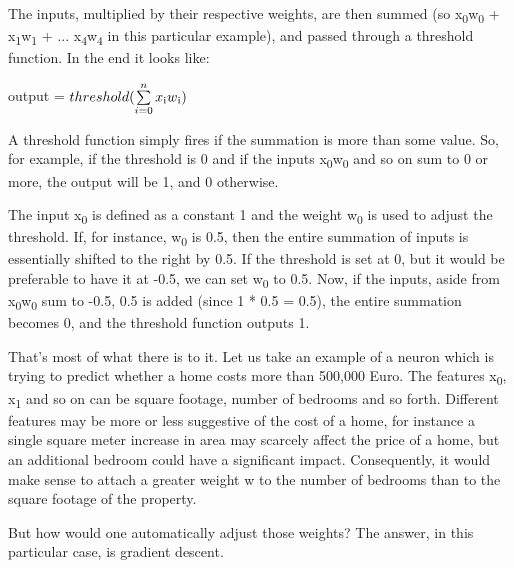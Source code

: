 \documentclass[a4paper, 12pt]{article}
\begin{document}
                        \par The inputs, multiplied by their respective weights, are then summed (so x\textsubscript{0}w\textsubscript{0} + x\textsubscript{1}w\textsubscript{1} + ... x\textsubscript{4}w\textsubscript{4} in this particular example), and passed through a threshold function. In the end it looks like:
                        
                        \par \centerline{ {\large output = \(threshold(\sum\limits_{i=0}^n x\textsubscript{i}w\textsubscript{i})\) } }
                        
                        \bigskip
                        
                        \par A threshold function simply fires if the summation is more than some value. So, for example, if the threshold is 0 and if the inputs x\textsubscript{0}w\textsubscript{0} and so on sum to 0 or more, the output will be 1, and 0 otherwise.
                        
                        \par The input x\textsubscript{0} is defined as a constant 1 and the weight w\textsubscript{0} is used to adjust the threshold. If, for instance, w\textsubscript{0} is 0.5, then the entire summation of inputs is essentially shifted to the right by 0.5. If the threshold is set at 0, but it would be preferable to have it at -0.5, we can set w\textsubscript{0} to 0.5. Now, if the inputs, aside from x\textsubscript{0}w\textsubscript{0} sum to -0.5, 0.5 is added (since 1 * 0.5 = 0.5), the entire summation becomes 0, and the threshold function outputs 1.
                    
                        \par That's most of what there is to it. Let us take an example of a neuron which is trying to predict whether a home costs more than 500,000 Euro. The features x\textsubscript{0}, x\textsubscript{1} and so on can be square footage, number of bedrooms and so forth. Different features may be more or less suggestive of the cost of a home, for instance a single square meter increase in area may scarcely affect the price of a home, but an additional bedroom could have a significant impact. Consequently, it would make sense to attach a greater weight w to the number of bedrooms than to the square footage of the property.
                        
                        \par But how would one automatically adjust those weights? The answer, in this particular case, is gradient descent.
                        
\end{document}
